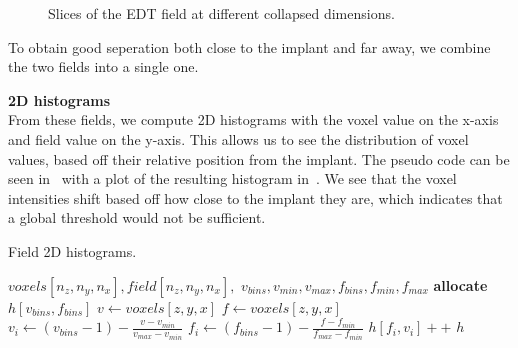 \begin{figure}
    \caption{Slices of the EDT field at different collapsed dimensions.}
    \label{fig:field-slices}
\end{figure}

To obtain good seperation both close to the implant and far away, we combine the two fields into a single one.


\vspace{\baselineskip}
\noindent\textbf{2D histograms} \\

From these fields, we compute 2D histograms with the voxel value on the x-axis and field value on the y-axis.
This allows us to see the distribution of voxel values, based off their relative position from the implant.
The pseudo code can be seen in~ with a plot of the resulting histogram in~.
We see that the voxel intensities shift based off how close to the implant they are, which indicates that a global threshold would not be sufficient.


\begin{algorithm}
    \caption{Field 2D histograms.}
    \label{alg:field-hist}
    \begin{algorithmic}
         {$voxels[n_z,n_y,n_x], field[n_z,n_y,n_x],$ \newline $v_{bins}, v_{min}, v_{max}, f_{bins}, f_{min}, f_{max}$}
            \State \textbf{allocate} $h[v_{bins},f_{bins}]$
                \State $v \gets voxels[z,y,x]$
                    \State $f \gets voxels[z,y,x]$
                        \State $v_i \gets (v_{bins} - 1) - \frac{v - v_{min}}{v_{max} - v_{min}}$
                        \State $f_i \gets (f_{bins} - 1) - \frac{f - f_{min}}{f_{max} - f_{min}}$
                        \State $h[f_i,v_i]{+}{+}$
                    \EndIf
                \EndIf
            \EndFor
            \Return $h$
        \EndFunction
    \end{algorithmic}
\end{algorithm}

